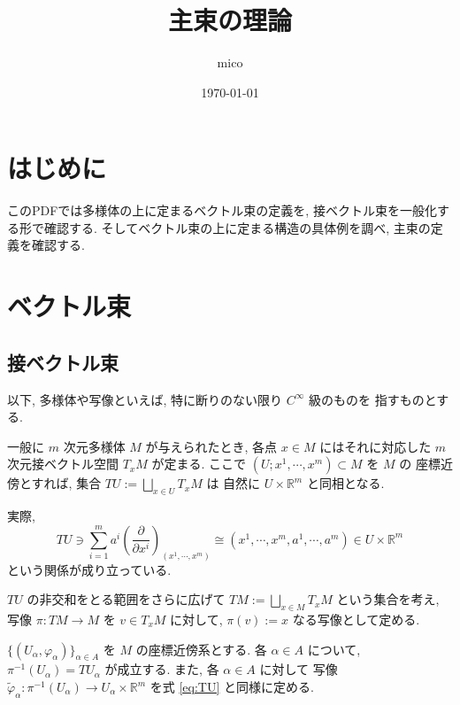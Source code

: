 \documentclass[a4paper,11pt]{ltjsarticle} %
\title{主束の理論
}
\author{mico}
\date{\today}
\begin{document}
  \maketitle

  \section{はじめに}

  このPDFでは多様体の上に定まるベクトル束の定義を, 
  接ベクトル束を一般化する形で確認する. 
  そしてベクトル束の上に定まる構造の具体例を調べ, 
  主束の定義を確認する. 

  \section{ベクトル束}

  \subsection{接ベクトル束}

  以下, 多様体や写像といえば, 特に断りのない限り \( C^{\infty} \) 級のものを
  指すものとする. 

  一般に \( m \) 次元多様体 \( M \) が与えられたとき, 
  各点 \( x \in M \) にはそれに対応した 
  \( m \) 次元接ベクトル空間 \( T _x M \) が定まる. 
  ここで \( (U; x^1, \cdots, x^m) \subset M \) を \( M \) の
  座標近傍とすれば, 集合 
  \( \displaystyle TU := \bigsqcup_{x \in U} T _x M \) は
  自然に \( U \times \mathbb{R}^m \) と同相となる. 

  実際,
  \begin{equation}
    TU \ni \sum_{i=1}^m a^i 
    \left( \frac{\partial}{\partial x^i} \right)_{(x^1, \cdots, x^m)} 
    \cong (x^1, \cdots, x^m, a^1, \cdots, a^m) 
    \in U \times \mathbb{R}^m
    \label{eq:TU}
  \end{equation}
  という関係が成り立っている. 

  \( TU \) の非交和をとる範囲をさらに広げて 
  \( \displaystyle TM := \bigsqcup_{x \in M} T_x M \)
  という集合を考え, 写像 \( \pi : TM \to M \) を 
  \( v \in T_x M \) に対して, 
  \( \pi (v) := x \) なる写像として定める. 

  \( \{ (U_{\alpha}, \varphi_{\alpha}) \}_{\alpha \in A} \)
  を \( M \) の座標近傍系とする. 各 \( \alpha \in A \) について, 
  \( \pi^{-1} (U_{\alpha}) = TU_{\alpha} \) が成立する. 
  また, 各 \( \alpha \in A \) に対して 
  写像 \( \widetilde{\varphi} _\alpha :
  \pi^{-1} (U_{\alpha}) \to U_{\alpha} \times \mathbb{R}^m \)
  を式 \eqref{eq:TU} と同様に定める. 
  
\end{document}
